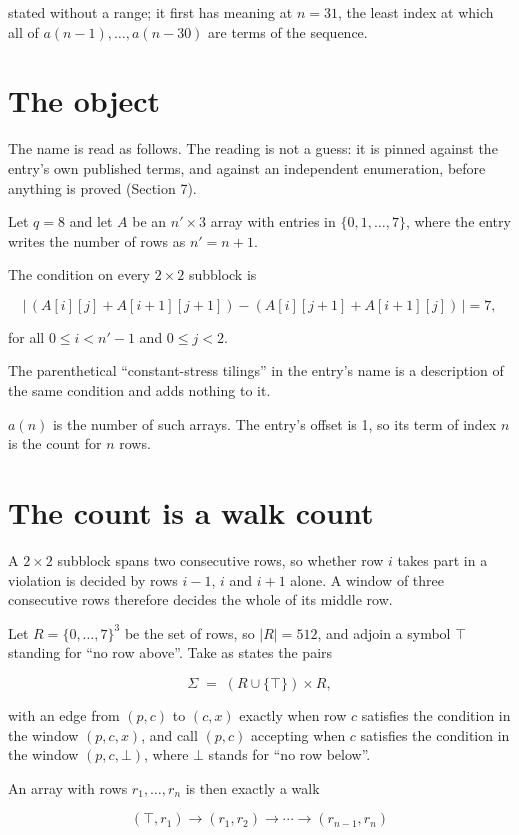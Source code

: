 \documentclass[11pt]{article}
\theoremstyle{definition}
\begin{document}
stated without a range; it first has meaning at $n = 31$, the least index at which all of $a(n-1),\dots,a(n-30)$ are terms of the sequence.

\section{The object}

The name is read as follows. The reading is not a guess: it is pinned against the entry's own published terms, and against an independent enumeration, before anything is proved (Section 7).

Let $q = 8$ and let $A$ be an $n' \times 3$ array with entries in $\{0,1,\dots,7\}$, where the entry writes the number of rows as $n' = n + 1$.

The condition on every $2 \times 2$ subblock is

\[\bigl|\,(A[i][j] + A[i{+}1][j{+}1]) - (A[i][j{+}1] + A[i{+}1][j])\,\bigr| = 7,\]

for all $0 \le i < n'-1$ and $0 \le j < 2$.

The parenthetical ``constant-stress tilings'' in the entry's name is a description of the same condition and adds nothing to it.

$a(n)$ is the number of such arrays. The entry's offset is 1, so its term of index $n$ is the count for $n$ rows.

\section{The count is a walk count}

A $2 \times 2$ subblock spans two consecutive rows, so whether row $i$ takes part in a violation is decided by rows $i-1$, $i$ and $i+1$ alone. A window of three consecutive rows therefore decides the whole of its middle row.

Let $R = \{0,\dots,7\}^{3}$ be the set of rows, so $|R| = 512$, and adjoin a symbol $\top$ standing for ``no row above''. Take as states the pairs

\[\Sigma \;=\; (R \cup \{\top\}) \times R,\]

with an edge from $(p,c)$ to $(c,x)$ exactly when row $c$ satisfies the condition in the window $(p,c,x)$, and call $(p,c)$ accepting when $c$ satisfies the condition in the window $(p,c,\bot)$, where $\bot$ stands for ``no row below''.

An array with rows $r_1,\dots,r_n$ is then exactly a walk

\[(\top,r_1) \to (r_1,r_2) \to \cdots \to (r_{n-1},r_n)\]
\end{document}
